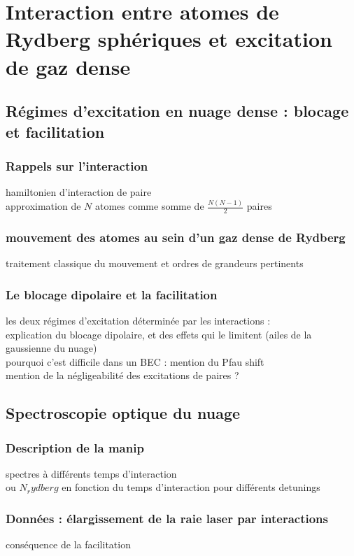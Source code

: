 \chapter{Interaction entre atomes de Rydberg sphériques et excitation de gaz dense}
\label{chapter:60s}

\section{Régimes d'excitation en nuage dense : blocage et facilitation}
	\subsection{Rappels sur l'interaction}
		\noindent hamiltonien d'interaction de paire \\
		approximation de $N$ atomes comme somme de $\frac{N(N-1)}{2}$ paires
	\subsection{mouvement des atomes au sein d'un gaz dense de Rydberg}
		\noindent  traitement classique du mouvement et ordres de grandeurs pertinents
	\subsection{Le blocage dipolaire et la facilitation}
		\noindent les deux régimes d'excitation déterminée par les interactions :\\
		explication du blocage dipolaire, et des effets qui le limitent (ailes de la gaussienne du nuage) \\
		pourquoi c'est difficile dans un BEC : mention du Pfau shift \\
		mention de la négligeabilité des excitations de paires ?

\section{Spectroscopie optique du nuage}
	\subsection{Description de la manip}
		\noindent spectres à différents temps d'interaction\\
		ou $N_rydberg$ en fonction du temps d'interaction pour différents detunings
		
	\subsection{Données : élargissement de la raie laser par interactions}
		\noindent conséquence de la facilitation
		
